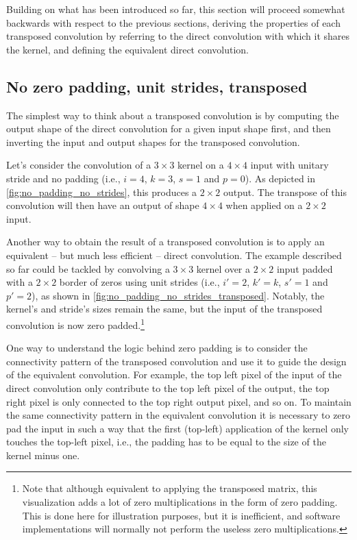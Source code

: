 Building on what has been introduced so far, this section will proceed somewhat
backwards with respect to the previous sections, deriving the properties of
each transposed convolution by referring to the direct convolution with which
it shares the kernel, and defining the equivalent direct convolution.

\subsection{No zero padding, unit strides, transposed}

The simplest way to think about a transposed convolution is by computing the
output shape of the direct convolution for a given input shape first, and then
inverting the input and output shapes for the transposed convolution.

Let's consider the convolution of a $3 \times 3$ kernel on a $4 \times 4$
input with unitary stride and no padding (i.e., $i = 4$, $k = 3$, $s = 1$ and
$p = 0$). As depicted in \autoref{fig:no_padding_no_strides}, this produces a
$2 \times 2$ output. The transpose of this convolution will then have an output
of shape $4 \times 4$ when applied on a $2 \times 2$ input.

Another way to obtain the result of a transposed convolution is to apply an
equivalent -- but much less efficient -- direct convolution. The example
described so far could be tackled by convolving a $3 \times 3$ kernel over a
$2 \times 2$ input padded with a $2 \times 2$ border of zeros using unit
strides (i.e., $i' = 2$, $k' = k$, $s' = 1$ and $p' = 2$), as shown in
\autoref{fig:no_padding_no_strides_transposed}. Notably, the kernel's and
stride's sizes remain the same, but the input of the transposed convolution is
now zero padded.\footnote{Note that although
    equivalent to applying the transposed matrix, this visualization adds a lot
    of zero multiplications in the form of zero padding.  This is done here for
    illustration purposes, but it is inefficient, and software implementations
    will normally not perform the useless zero multiplications.}

One way to understand the logic behind zero padding is to consider the
connectivity pattern of the transposed convolution and use it to guide the
design of the equivalent convolution. For example, the top left pixel of the
input of the direct convolution only contribute to the top left pixel of the
output, the top right pixel is only connected to the top right output pixel,
and so on. To maintain the same connectivity pattern in the equivalent
convolution it is necessary to zero pad the input in such a way that the first
(top-left) application of the kernel only touches the top-left pixel, i.e., the
padding has to be equal to the size of the kernel minus one.

